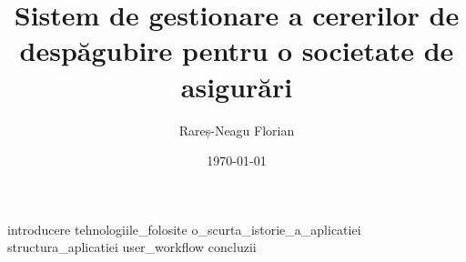 \documentclass[a4paper,12pt]{report}
\title{Sistem de gestionare a cererilor de despăgubire pentru o societate de asigurări}
\author{Rareș-Neagu Florian}
\date{\today}
\begin{document}
\maketitle
\tableofcontents
\newpage
{introducere}
\newpage
{tehnologiile_folosite}
\newpage
{o_scurta_istorie_a_aplicatiei}
\newpage
{structura_aplicatiei}
\newpage
{user_workflow}
\newpage
{concluzii}
\newpage
{}
\printbibliography[title={Bibliografie}]
\end{document}
